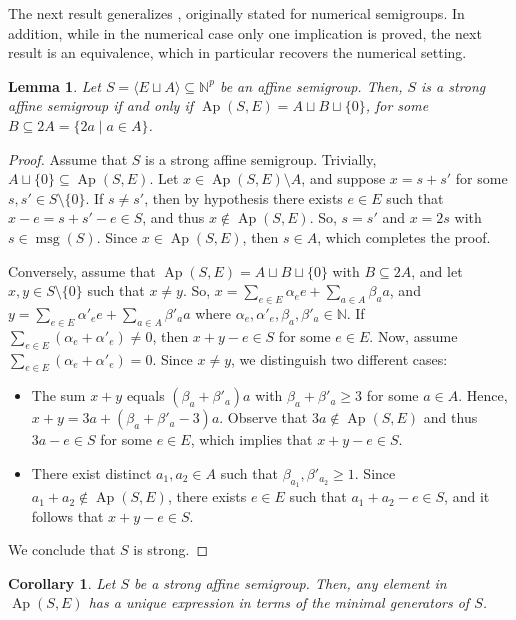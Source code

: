 \documentclass[a4paper,11pt]{article}
\newtheorem{corollary}[theorem]{Corollary}
\newtheorem{lemma}[theorem]{Lemma}
\def\N{\mathbb{N}}
\def\msg{\operatorname{msg}}
\def\Ap{\operatorname{Ap}}
\begin{document}
{The next result generalizes \cite[Proposition 5.7]{RoblesRosalesModularFrob}, originally stated for numerical semigroups. In addition, while in the numerical case only one implication is proved, the next result is an equivalence, which in particular recovers the numerical setting.

\begin{lemma}\label{lemaAperys}
Let $S=\langle E\sqcup A\rangle\subseteq \N^p$ be an affine semigroup. Then, $S$ is a strong affine semigroup if and only if $\Ap (S,E)= A \sqcup B\sqcup \{0\}$, for some $B\subseteq 2A=\{2a\mid a\in A \}$.
\end{lemma}

\begin{proof}
Assume that $S$ is a strong affine semigroup. Trivially, $A\sqcup \{0\}\subseteq \Ap (S,E)$. Let $x\in \Ap (S,E)\setminus A$, and suppose $x=s+s'$ for some $s,s'\in S\setminus \{0\}$. If $s\neq s'$, then by hypothesis there exists $e\in E$ such that $x-e=s+s'-e\in S$, and thus $x\notin \Ap (S,E)$. So, $s=s'$ and $x=2s$ with $s\in \msg (S)$. Since $x\in \Ap (S,E)$, then $s\in A$, which completes the proof.

Conversely, assume that $\Ap(S,E)= A \sqcup B \sqcup \{0\}$ with $B\subseteq 2A$, and let $x,y\in S\setminus\{0\}$ such that $x\ne y$. So, $x=\sum_{e\in E}\alpha_e e + \sum _{a\in A} \beta_a a$, and $y=\sum_{e\in E}\alpha'_e e + \sum _{a\in A} \beta'_a a$ where $\alpha_e,\alpha'_e,\beta_a,\beta'_a\in \N$. If $\sum_{e\in E} (\alpha_e+\alpha'_e)\neq 0$, then $x+y-e\in S$ for some $e\in E$. Now, assume $\sum_{e\in E} (\alpha_e+\alpha'_e)= 0$. Since $x\ne y$, we distinguish two different cases:
\begin{itemize}
    \item The sum $x+y$ equals $(\beta_a+\beta'_a)a$ with $\beta_a+\beta'_a\geq3$ for some $a\in A$. Hence, $x+y=3a+(\beta_a+\beta'_a-3)a$. Observe that $3a\notin \Ap (S,E)$ and thus $3a-e\in S$ for some $e\in E$, which implies that $x+y-e\in S$.
    \item There exist distinct $a_1,a_2\in A$ such that $\beta_{a_1}, \beta'_{a_2}\geq 1$. Since $a_1+a_2\notin \Ap(S,E)$, there exists $e\in E$ such that $a_1+a_2-e\in S$, and it follows that $x+y-e\in S$.
\end{itemize}
We conclude that $S$ is strong.
\end{proof}

\begin{corollary}\label{escritura_unica}
Let $S$ be a strong affine semigroup. Then, any element in $\Ap (S,E)$ has a unique expression in terms of the minimal generators of $S$.
\end{corollary}

}
\end{document}
